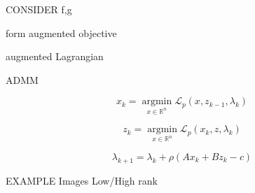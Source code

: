 CONSIDER f,g

form augmented objective

augmented  Lagrangian

ADMM

$$x_k=\underset{x \in \mathbb{R}^{n} }{\operatorname{argmin}}\mathcal{L}_p(x,z_{k-1},\lambda_k) $$

$$z_k=\underset{x \in \mathbb{R}^{n} }{\operatorname{argmin}}\mathcal{L}_p(x_k,z,\lambda_k) $$

$$ \lambda_{k+1}=\lambda_k+\rho(Ax_k+Bz_k-c)$$

EXAMPLE Images Low/High rank


